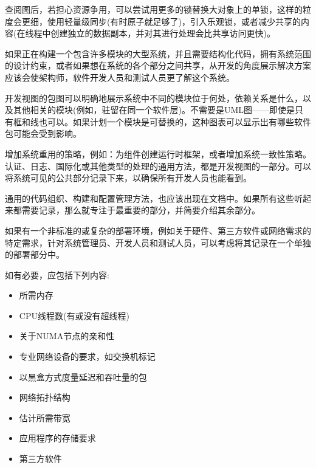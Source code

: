 查阅图后，若担心资源争用，可以尝试用更多的锁替换大对象上的单锁，这样的粒度会更细，使用轻量级同步(有时原子就足够了)，引入乐观锁，或者减少共享的内容(在线程中创建独立的数据副本，并对其进行处理会比共享访问更快)。


如果正在构建一个包含许多模块的大型系统，并且需要结构化代码，拥有系统范围的设计约束，或者如果想在系统的各个部分之间共享，从开发的角度展示解决方案应该会使架构师，软件开发人员和测试人员更了解这个系统。

开发视图的包图可以明确地展示系统中不同的模块位于何处，依赖关系是什么，以及其他相关的模块(例如，驻留在同一个软件层)。不需要是UML图——即使是只有框和线也可以。如果计划一个模块是可替换的，这种图表可以显示出有哪些软件包可能会受到影响。

增加系统重用的策略，例如：为组件创建运行时框架，或者增加系统一致性策略。认证、日志、国际化或其他类型的处理的通用方法，都是开发视图的一部分。可以将系统可见的公共部分记录下来，以确保所有开发人员也能看到。

通用的代码组织、构建和配置管理方法，也应该出现在文档中。如果所有这些听起来都需要记录，那么就专注于最重要的部分，并简要介绍其余部分。


如果有一个非标准的或复杂的部署环境，例如关于硬件、第三方软件或网络需求的特定需求，针对系统管理员、开发人员和测试人员，可以考虑将其记录在一个单独的部署部分中。

如有必要，应包括下列内容:

\begin{itemize}
\item
所需内存

\item 
CPU线程数(有或没有超线程)

\item 
关于NUMA节点的亲和性

\item 
专业网络设备的要求，如交换机标记

\item 
以黑盒方式度量延迟和吞吐量的包

\item 
网络拓扑结构

\item 
估计所需带宽

\item 
应用程序的存储要求

\item 
第三方软件
\end{itemize}

